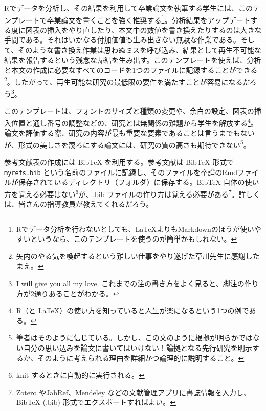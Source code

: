 \documentclass[lualatex,
               a4paper,
               10.5pt,
               ja=standard,
               jafont=ipaex]{bxjsarticle}
\begin{document}
Rでデータを分析し、その結果を利用して卒業論文を執筆する学生には、このテンプレートで卒業論文を書くことを強く推奨する\footnote{Rでデータ分析を行わないとしても、\LaTeX よりもMarkdownのほうが使いやすいというなら、このテンプレートを使うのが簡単かもしれない。}。分析結果をアップデートする度に図表の挿入をやり直したり、本文中の数値を書き換えたりするのは大きな手間である。それはいかなる付加価値も生み出さない無駄な作業である。そして、そのような書き換え作業は思わぬミスを呼び込み、結果として再生不可能な結果を報告するという残念な帰結を生み出す。このテンプレートを使えば、分析と本文の作成に必要なすべてのコードを1つのファイルに記録することができる\footnote{矢内のやる気を喚起するという難しい仕事をやり遂げた草川先生に感謝したまえ。}。したがって、再生可能な研究の最低限の要件を満たすことが容易になるだろう\footnote{I will give you all my love. これまでの注の書き方をよく見ると、脚注の作り方が2通りあることがわかる。}。

このテンプレートは、フォントのサイズと種類の変更や、余白の設定、図表の挿入位置と通し番号の調整などの、研究とは無関係の難題から学生を解放する\footnote{R（と \LaTeX ）の使い方を知っていると人生が楽になるという1つの例である。}。 論文を評価する際、研究の内容が最も重要な要素であることは言うまでもないが、形式の美しさを蔑ろにする論文には、研究の質の高さも期待できない\footnote{筆者はそのように信じている。しかし、この文のように根拠が明らかではない自分の思い込みを論文に書いてはいけない！論拠となる先行研究を明示するか、そのように考えられる理由を詳細かつ論理的に説明すること。}。

参考文献表の作成には BibTeX を利用する。参考文献は BibTeX 形式で \texttt{myrefs.bib} という名前のファイルに記録し、そのファイルを卒論のRmdファイルが保存されているディレクトリ（フォルダ）に保存する。BibTeX 自体の使い方を覚える必要はない\footnote{knit するときに自動的に実行される。}が、.bib ファイルの作り方は覚える必要がある\footnote{Zotero やJabRef、Mendeley などの文献管理アプリに書誌情報を入力し、BibTeX (.bib) 形式でエクスポートすればよい。}。詳しくは、皆さんの指導教員が教えてくれるだろう。
\end{document}
